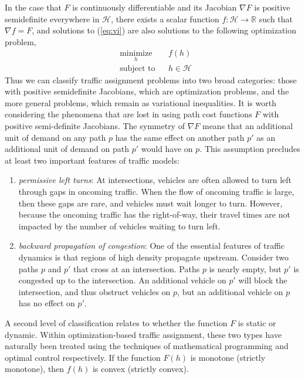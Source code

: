 In the case that $F$ is continuously differentiable and its Jacobian $\nabla F$ is positive semidefinite everywhere in $\mathcal{H}$, there exists a scalar function $f:\mathcal{H}\rightarrow \mathbb{R}$ such that $\nabla f = F$, and solutions to (\ref{eq:vi}) are also solutions to the following optimization problem,
\begin{equation}
\label{eq:opt}
\begin{aligned}
& \underset{h}{\text{minimize}}
& & f(h) \\
& \text{subject to}
& & h \in \mathcal{H}
\end{aligned}
\end{equation}
Thus we can classify traffic assignment problems into two broad categories: those with positive semidefinite Jacobians, which are optimization problems, and the more general problems, which remain as variational inequalities. It is worth considering the phenomena that are lost in using path cost functions $F$ with positive semi-definite Jacobians. The symmetry of $\nabla F$ means that an additional unit of demand on any path $p$ has the same effect on another path $p'$ as an additional unit of demand on path $p'$ would have on $p$. This assumption precludes at least two important features of traffic models:
\begin{enumerate}
\item \textit{permissive left turns}: At intersections, vehicles are often allowed to turn left through gaps in oncoming traffic. When the flow of oncoming traffic is large, then these gaps are rare, and vehicles must wait longer to turn. However, because the oncoming traffic has the right-of-way, their travel times are not impacted by the number of vehicles waiting to turn left. 
\item \textit{backward propagation of congestion}: One of the essential features of traffic dynamics is that regions of high density propagate upstream. Consider two paths $p$ and $p'$ that cross at an intersection. Paths $p$ is nearly empty, but $p'$ is congested up to the intersection. An additional vehicle on $p'$ will block the intersection, and thus obstruct vehicles on $p$, but an additional vehicle on $p$ has no effect on $p'$.
\end{enumerate}
A second level of classification relates to whether the function $F$ is static or dynamic. Within optimization-based traffic assignment, these two types have naturally been treated using the techniques of mathematical programming and optimal control respectively. If the function $F(h)$ is monotone (strictly monotone), then $f(h)$ is convex (strictly convex).
